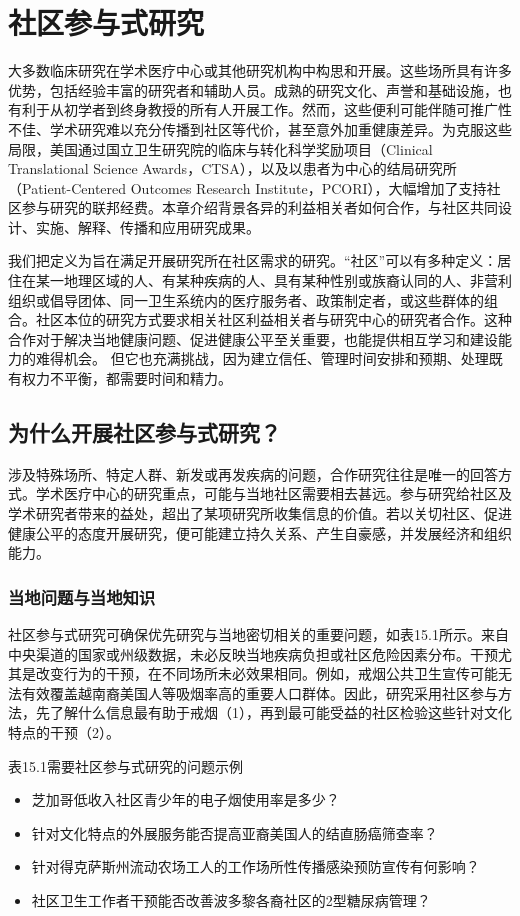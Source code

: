 \chapter{社区参与式研究}
大多数临床研究在学术医疗中心或其他研究机构中构思和开展。这些场所具有许多优势，包括经验丰富的研究者和辅助人员。成熟的研究文化、声誉和基础设施，也有利于从初学者到终身教授的所有人开展工作。然而，这些便利可能伴随可推广性不佳、学术研究难以充分传播到社区等代价，甚至意外加重健康差异。为克服这些局限，美国通过国立卫生研究院的临床与转化科学奖励项目（Clinical Translational Science Awards，CTSA），以及以患者为中心的结局研究所（Patient-Centered Outcomes Research Institute，PCORI），大幅增加了支持社区参与研究的联邦经费。本章介绍背景各异的利益相关者如何合作，与社区共同设计、实施、解释、传播和应用研究成果。

我们把定义为旨在满足开展研究所在社区需求的研究。“社区”可以有多种定义：居住在某一地理区域的人、有某种疾病的人、具有某种性别或族裔认同的人、非营利组织或倡导团体、同一卫生系统内的医疗服务者、政策制定者，或这些群体的组合。社区本位的研究方式要求相关社区利益相关者与研究中心的研究者合作。这种合作对于解决当地健康问题、促进健康公平至关重要，也能提供相互学习和建设能力的难得机会。
但它也充满挑战，因为建立信任、管理时间安排和预期、处理既有权力不平衡，都需要时间和精力。

\section{为什么开展社区参与式研究？}
涉及特殊场所、特定人群、新发或再发疾病的问题，合作研究往往是唯一的回答方式。学术医疗中心的研究重点，可能与当地社区需要相去甚远。参与研究给社区及学术研究者带来的益处，超出了某项研究所收集信息的价值。若以关切社区、促进健康公平的态度开展研究，便可能建立持久关系、产生自豪感，并发展经济和组织能力。

\subsection{当地问题与当地知识}
社区参与式研究可确保优先研究与当地密切相关的重要问题，如表15.1所示。来自中央渠道的国家或州级数据，未必反映当地疾病负担或社区危险因素分布。干预尤其是改变行为的干预，在不同场所未必效果相同。例如，戒烟公共卫生宣传可能无法有效覆盖越南裔美国人等吸烟率高的重要人口群体。因此，研究采用社区参与方法，先了解什么信息最有助于戒烟（1），再到最可能受益的社区检验这些针对文化特点的干预（2）。

\begin{bookbox}{表15.1\quad 需要社区参与式研究的问题示例}
\begin{itemize}
\item 芝加哥低收入社区青少年的电子烟使用率是多少？
\item 针对文化特点的外展服务能否提高亚裔美国人的结直肠癌筛查率？
\item 针对得克萨斯州流动农场工人的工作场所性传播感染预防宣传有何影响？
\item 社区卫生工作者干预能否改善波多黎各裔社区的2型糖尿病管理？
\end{itemize}
\end{bookbox}

